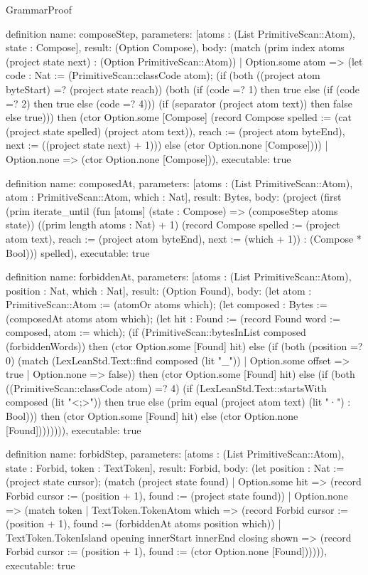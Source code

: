 \begin{lexlean}{GrammarProof}
\begin{semanticmodule}
definition{
  name: composeStep,
  parameters: [atoms : (List PrimitiveScan::Atom), state : Compose],
  result: (Option Compose),
  body: (match (prim index atoms (project state next) : (Option PrimitiveScan::Atom))
    | Option.some atom => (let code : Nat := (PrimitiveScan::classCode atom); (if (both ((project atom byteStart) =? (project state reach)) (both (if (code =? 1) then true else (if (code =? 2) then true else (code =? 4))) (if (separator (project atom text)) then false else true))) then (ctor Option.some [Compose] (record Compose {spelled := (cat (project state spelled) (project atom text)), reach := (project atom byteEnd), next := ((project state next) + 1)})) else (ctor Option.none [Compose])))
    | Option.none => (ctor Option.none [Compose])),
  executable: true
}

definition{
  name: composedAt,
  parameters: [atoms : (List PrimitiveScan::Atom), atom : PrimitiveScan::Atom, which : Nat],
  result: Bytes,
  body: (project (first (prim iterate_until (fun [atoms] (state : Compose) => (composeStep atoms state)) ((prim length atoms : Nat) + 1) (record Compose {spelled := (project atom text), reach := (project atom byteEnd), next := (which + 1)}) : (Compose * Bool))) spelled),
  executable: true
}

definition{
  name: forbiddenAt,
  parameters: [atoms : (List PrimitiveScan::Atom), position : Nat, which : Nat],
  result: (Option Found),
  body: (let atom : PrimitiveScan::Atom := (atomOr atoms which); (let composed : Bytes := (composedAt atoms atom which); (let hit : Found := (record Found {word := composed, atom := which}); (if (PrimitiveScan::bytesInList composed (forbiddenWords)) then (ctor Option.some [Found] hit) else (if (both (position =? 0) (match (LexLeanStd.Text::find composed (lit "_"))
    | Option.some offset => true
    | Option.none => false)) then (ctor Option.some [Found] hit) else (if (both ((PrimitiveScan::classCode atom) =? 4) (if (LexLeanStd.Text::startsWith composed (lit "<;>")) then true else (prim equal (project atom text) (lit "·") : Bool))) then (ctor Option.some [Found] hit) else (ctor Option.none [Found]))))))),
  executable: true
}

definition{
  name: forbidStep,
  parameters: [atoms : (List PrimitiveScan::Atom), state : Forbid, token : TextToken],
  result: Forbid,
  body: (let position : Nat := (project state cursor); (match (project state found)
    | Option.some hit => (record Forbid {cursor := (position + 1), found := (project state found)})
    | Option.none => (match token
      | TextToken.TokenAtom which => (record Forbid {cursor := (position + 1), found := (forbiddenAt atoms position which)})
      | TextToken.TokenIsland opening innerStart innerEnd closing shown => (record Forbid {cursor := (position + 1), found := (ctor Option.none [Found])})))),
  executable: true
}


\end{semanticmodule}
\end{lexlean}

